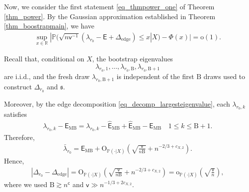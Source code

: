 \documentclass[12pt]{article}
\theoremstyle{plain}
\numberwithin{equation}{section}
\begin{document}
Now, we consider the first statement \eqref{eq_thmpower_one} of Theorem \ref{thm_power}.
By the Gaussian approximation established in Theorem \ref{thm_boostrapmain}, we have
\begin{align}\label{eq_power_null_clt}
	\sup_{x\in\mathbb R}|\mathbb{P}\big(\sqrt{n\mathsf{v}^{-1}}(\lambda_{r_0}-\mathsf{E}+\Delta_{\mathrm{edge}})\le x|X)-\Phi(x)\big|=\mathrm{o}(1).
\end{align}

Recall that, conditional on $X$, the bootstrap eigenvalues
\[
\lambda_{r_0,1},\dots,\lambda_{r_0,\mathrm B},\lambda_{r_0,\mathrm{B}+1}
\]
are i.i.d., and the fresh draw $\lambda_{r_0,\mathrm{B}+1}$ is independent of the first $\mathrm B$ draws used to construct $\Delta_{r_0}$ and $\mathfrak s$.

Moreover, by the edge decomposition \eqref{eq_decomp_largesteigenvalue}, each $\lambda_{r_0,k}$ satisfies
\begin{align*}
	\lambda_{r_0,k}-\mathsf{E}_{\mathrm{MB}}=\lambda_{r_0,k}-\widehat{\mathsf{E}}_{\mathrm{MB}}+\widehat{\mathsf{E}}_{\mathrm{MB}}-\mathsf{E}_{\mathrm{MB}}\quad 1\le k\le \mathrm{B}+1.
\end{align*}
Therefore,
\begin{align*}
	\bar{\lambda}_{r_0}
	=
	\mathsf{E}_{\mathrm{MB}}+\mathrm{O}_{\mathbb P(\cdot|X)}\!\left(\sqrt{\frac{\mathsf{v}}{n\mathrm{B}}}+n^{-2/3+c_{X,2}}\right).
\end{align*}
Hence,
\begin{align}\label{eq_biasestimation}
	|\Delta_{r_0}-\Delta_{\mathrm{edge}}|
	=
	\mathrm{O}_{\mathbb P(\cdot|X)}\!\left( \sqrt{\frac{\mathsf{v}}{n\mathrm{B}}}+n^{-2/3+c_{X,2}}\right)
	=
	\mathrm{o}_{\mathbb P(\cdot|X)}\!\left(\sqrt{\frac{\mathsf v}{n}}\right),
\end{align}
where we used $\mathrm B\gtrsim n^{\mathsf c}$ and $\mathsf{v}\gg n^{-1/3+2c_{X,2}}$. 
\end{document}
